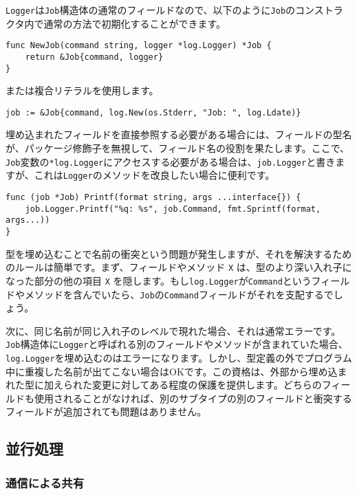 \documentclass{jsarticle}
\begin{document}
\texttt{Logger}は\texttt{Job}構造体の通常のフィールドなので、以下のように\texttt{Job}のコンストラクタ内で通常の方法で初期化することができます。

\begin{lstlisting}[numbers=none]
func NewJob(command string, logger *log.Logger) *Job {
    return &Job{command, logger}
}
\end{lstlisting}

または複合リテラルを使用します。

\begin{lstlisting}[numbers=none]
job := &Job{command, log.New(os.Stderr, "Job: ", log.Ldate)}
\end{lstlisting}

埋め込まれたフィールドを直接参照する必要がある場合には、フィールドの型名が、パッケージ修飾子を無視して、フィールド名の役割を果たします。ここで、\texttt{Job}変数の\texttt{*log.Logger}にアクセスする必要がある場合は、\texttt{job.Logger}と書きますが、これは\texttt{Logger}のメソッドを改良したい場合に便利です。

\begin{lstlisting}[numbers=none]
func (job *Job) Printf(format string, args ...interface{}) {
    job.Logger.Printf("%q: %s", job.Command, fmt.Sprintf(format, args...))
}
\end{lstlisting}

型を埋め込むことで名前の衝突という問題が発生しますが、それを解決するためのルールは簡単です。まず、フィールドやメソッド
\texttt{X} は、型のより深い入れ子になった部分の他の項目 \texttt{X}
を隠します。もし\texttt{log.Logger}が\texttt{Command}というフィールドやメソッドを含んでいたら、\texttt{Job}の\texttt{Command}フィールドがそれを支配するでしょう。

次に、同じ名前が同じ入れ子のレベルで現れた場合、それは通常エラーです。\texttt{Job}構造体に\texttt{Logger}と呼ばれる別のフィールドやメソッドが含まれていた場合、\texttt{log.Logger}を埋め込むのはエラーになります。しかし、型定義の外でプログラム中に重複した名前が出てこない場合はOKです。この資格は、外部から埋め込まれた型に加えられた変更に対してある程度の保護を提供します。どちらのフィールドも使用されることがなければ、別のサブタイプの別のフィールドと衝突するフィールドが追加されても問題はありません。

\subsection{並行処理}

\subsubsection{通信による共有}
\end{document}

